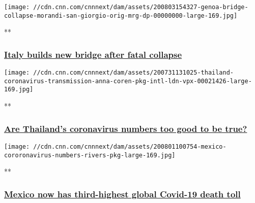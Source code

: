 \href{/videos/world/2020/08/03/genoa-bridge-collapse-morandi-san-giorgio-orig-mrg-dp.cnn/video/playlists/around-the-world/}{}

\texttt{[image: //cdn.cnn.com/cnnnext/dam/assets/200803154327-genoa-bridge-collapse-morandi-san-giorgio-orig-mrg-dp-00000000-large-169.jpg]}

**

\hypertarget{italy-builds-new-bridge-after-fatal-collapse}{%
\subsubsection{\texorpdfstring{\href{/videos/world/2020/08/03/genoa-bridge-collapse-morandi-san-giorgio-orig-mrg-dp.cnn/video/playlists/around-the-world/}{Italy
builds new bridge after fatal
collapse}}{Italy builds new bridge after fatal collapse}}\label{italy-builds-new-bridge-after-fatal-collapse}}

\href{/videos/world/2020/07/31/thailand-coronavirus-transmission-anna-coren-pkg-intl-ldn-vpx.cnn/video/playlists/around-the-world/}{}

\texttt{[image: //cdn.cnn.com/cnnnext/dam/assets/200731131025-thailand-coronavirus-transmission-anna-coren-pkg-intl-ldn-vpx-00021426-large-169.jpg]}

**

\hypertarget{are-thailands-coronavirus-numbers-too-good-to-be-true-}{%
\subsubsection{\texorpdfstring{\href{/videos/world/2020/07/31/thailand-coronavirus-transmission-anna-coren-pkg-intl-ldn-vpx.cnn/video/playlists/around-the-world/}{Are
Thailand's coronavirus numbers too good to be true?
}}{Are Thailand's coronavirus numbers too good to be true? }}\label{are-thailands-coronavirus-numbers-too-good-to-be-true-}}

\href{/videos/world/2020/08/01/mexico-coronavirus-death-toll-rivers-pkg-vpx.cnn/video/playlists/around-the-world/}{}

\texttt{[image: //cdn.cnn.com/cnnnext/dam/assets/200801100754-mexico-cororonavirus-numbers-rivers-pkg-large-169.jpg]}

**

\hypertarget{mexico-now-has-third-highest-global-covid-19-death-toll}{%
\subsubsection{\texorpdfstring{\href{/videos/world/2020/08/01/mexico-coronavirus-death-toll-rivers-pkg-vpx.cnn/video/playlists/around-the-world/}{Mexico
now has third-highest global Covid-19 death
toll}}{Mexico now has third-highest global Covid-19 death toll}}\label{mexico-now-has-third-highest-global-covid-19-death-toll}}

